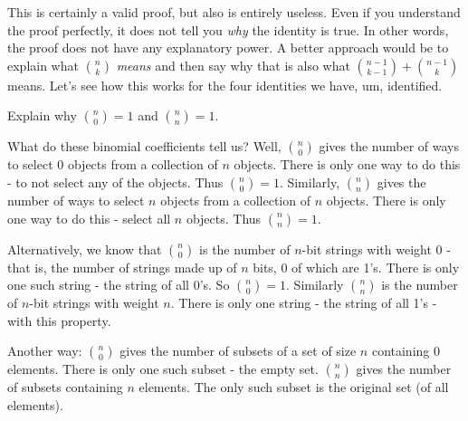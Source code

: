 \documentclass[12pt]{article}
\begin{document}
This is certainly a valid proof, but also is entirely useless.  Even if you understand the proof perfectly, it does not tell you {\em why} the identity is true.  In other words, the proof does not have any explanatory power.  A better approach would be to explain what ${n \choose k}$ {\em means} and then say why that is also what ${n-1 \choose k-1} + {n-1 \choose k}$ means.  Let's see how this works for the four identities we have, um, identified.

\begin{example}
  Explain why ${n \choose 0} = 1$ and ${n \choose n} = 1$.
  \begin{solution}
    What do these binomial coefficients tell us? Well, ${n \choose 0}$ gives the number of ways to select 0 objects from a collection of $n$ objects.  There is only one way to do this - to not select any of the objects.  Thus ${n \choose 0} = 1$.  Similarly, ${n \choose n}$ gives the number of ways to select $n$ objects from a collection of $n$ objects.  There is only one way to do this - select all $n$ objects.  Thus ${n \choose n} = 1$.
    
    Alternatively, we know that ${n \choose 0}$ is the number of $n$-bit strings with weight 0 - that is, the number of strings made up of $n$ bits, 0 of which are 1's.  There is only one such string - the string of all 0's.  So ${n \choose 0} = 1$.  Similarly ${n \choose n}$ is the number of $n$-bit strings with weight $n$.  There is only one string - the string of all 1's - with this property.
    
    Another way: ${n \choose 0}$ gives the number of subsets of a set of size $n$ containing 0 elements.  There is only one such subset - the empty set.  ${n \choose n}$ gives the number of subsets containing $n$ elements.  The only such subset is the original set (of all elements).
  \end{solution}

\end{example}
\end{document}
